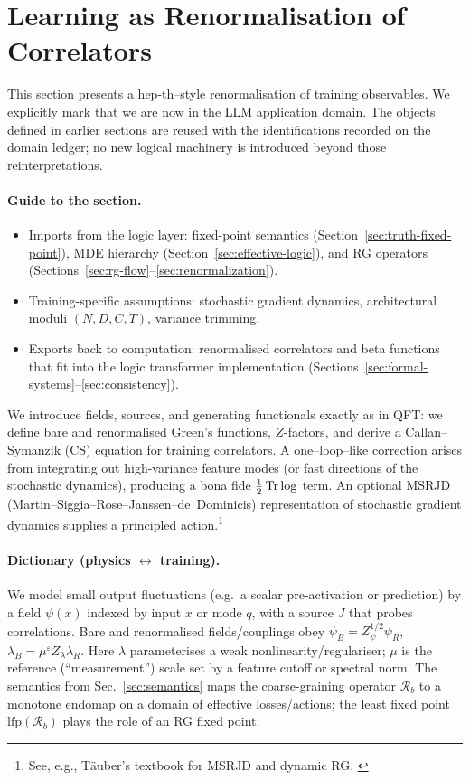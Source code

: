 \section{Learning as Renormalisation of Correlators}
\label{sec:llm_rg}

This section presents a hep-th–style renormalisation of training observables.
We explicitly mark that we are now in the LLM application domain. The objects defined in earlier sections are reused with the identifications recorded on the domain ledger; no new logical machinery is introduced beyond those reinterpretations.

\paragraph{Guide to the section.}
\begin{itemize}
  \item Imports from the logic layer: fixed-point semantics (Section~\ref{sec:truth-fixed-point}), MDE hierarchy (Section~\ref{sec:effective-logic}), and RG operators (Sections~\ref{sec:rg-flow}--\ref{sec:renormalization}).
  \item Training-specific assumptions: stochastic gradient dynamics, architectural moduli $(N,D,C,T)$, variance trimming.
  \item Exports back to computation: renormalised correlators and beta functions that fit into the logic transformer implementation (Sections~\ref{sec:formal-systems}--\ref{sec:consistency}).
\end{itemize}

We introduce fields, sources, and generating functionals exactly as in QFT:
we define bare and renormalised Green's functions, $Z$-factors, and derive a
Callan--Symanzik (CS) equation for training correlators. A one–loop–like
correction arises from integrating out high-variance feature modes (or fast
directions of the stochastic dynamics), producing a bona fide $\tfrac12\Tr\log$
term. An optional MSRJD (Martin--Siggia--Rose--Janssen--de~Dominicis) representation
of stochastic gradient dynamics supplies a principled action.\footnote{See,
e.g., Täuber's textbook for MSRJD and dynamic RG. \cite{TauberCriticalDynamics}} 

\paragraph{Dictionary (physics $\leftrightarrow$ training).}
We model small output fluctuations (e.g.\ a scalar pre-activation or prediction)
by a field $\psi(x)$ indexed by input $x$ or mode $q$, with a source $J$ that
probes correlations. Bare and renormalised fields/couplings obey
$\psi_B = Z_\psi^{1/2}\psi_R$, $\lambda_B=\mu^\varepsilon Z_\lambda \lambda_R$.
Here $\lambda$ parameterises a weak nonlinearity/regulariser; $\mu$ is the
reference (``measurement'') scale set by a feature cutoff or spectral norm.
The semantics from Sec.~\ref{sec:semantics} maps the coarse-graining operator
$\mathcal R_b$ to a monotone endomap on a domain of effective losses/actions;
the least fixed point $\mathrm{lfp}(\mathcal R_b)$ plays the role of an RG
fixed point.

